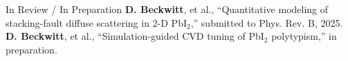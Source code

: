 

\nocite{*}


\printbibliography[heading={subbibliography},title={Journal Articles},type=article]

\printbibliography[heading={subbibliography},title={Conference Proceedings},type=inproceedings]

\printbibliography[heading={subbibliography},title={Books and Chapters},filter={booksandchapters}]

\begin{rubric}{In Review / In Preparation}
\entry*[2025] \textbf{D. Beckwitt}, et al., ``Quantitative modeling of stacking-fault diffuse scattering in 2-D PbI$_2$,'' submitted to Phys. Rev. B, 2025.
\entry*[\ ] \textbf{D. Beckwitt}, et al., ``Simulation-guided CVD tuning of PbI$_2$ polytypism,'' in preparation.
\end{rubric}


